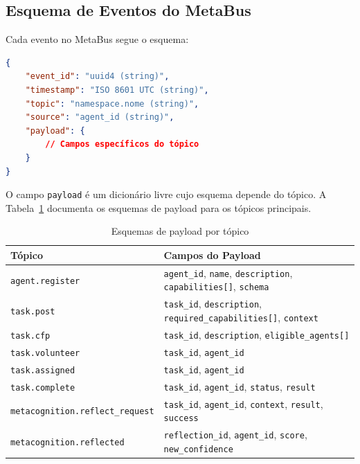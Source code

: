 \subsection{Esquema de Eventos do MetaBus}

Cada evento no MetaBus segue o esquema:

\begin{lstlisting}[language=json, caption={Esquema de evento do MetaBus}, label={lst:event-schema}]
{
    "event_id": "uuid4 (string)",
    "timestamp": "ISO 8601 UTC (string)",
    "topic": "namespace.nome (string)",
    "source": "agent_id (string)",
    "payload": {
        // Campos específicos do tópico
    }
}
\end{lstlisting}

O campo \texttt{payload} é um dicionário livre cujo esquema depende do tópico. A Tabela~\ref{tab:payload-schemas} documenta os esquemas de payload para os tópicos principais.

\begin{table}[htbp]
\centering
\caption{Esquemas de payload por tópico}
\label{tab:payload-schemas}
\begin{tabular}{@{}p{4.5cm}p{9cm}@{}}
\toprule
\textbf{Tópico} & \textbf{Campos do Payload} \\
\midrule
\texttt{agent.register} & \texttt{agent\_id}, \texttt{name}, \texttt{description}, \texttt{capabilities[]}, \texttt{schema} \\
\texttt{task.post} & \texttt{task\_id}, \texttt{description}, \texttt{required\_capabilities[]}, \texttt{context} \\
\texttt{task.cfp} & \texttt{task\_id}, \texttt{description}, \texttt{eligible\_agents[]} \\
\texttt{task.volunteer} & \texttt{task\_id}, \texttt{agent\_id} \\
\texttt{task.assigned} & \texttt{task\_id}, \texttt{agent\_id} \\
\texttt{task.complete} & \texttt{task\_id}, \texttt{agent\_id}, \texttt{status}, \texttt{result} \\
\texttt{metacognition.reflect\_request} & \texttt{task\_id}, \texttt{agent\_id}, \texttt{context}, \texttt{result}, \texttt{success} \\
\texttt{metacognition.reflected} & \texttt{reflection\_id}, \texttt{agent\_id}, \texttt{score}, \texttt{new\_confidence} \\
\bottomrule
\end{tabular}
\end{table}

